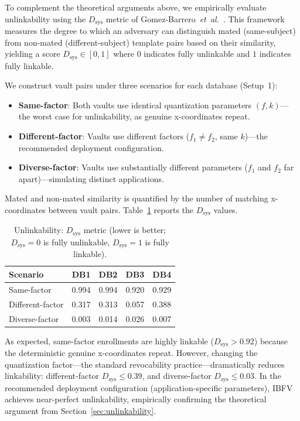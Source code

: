 \documentclass[3p,twocolumn]{elsarticle}
\newcommand{\IBFV}{\textsf{IBFV}}
\begin{document}
To complement the theoretical arguments above, we empirically evaluate unlinkability using the $D_{\text{sys}}$ metric of Gomez-Barrero~\textit{et~al.}~\cite{gomezbarrero2017}. This framework measures the degree to which an adversary can distinguish mated (same-subject) from non-mated (different-subject) template pairs based on their similarity, yielding a score $D_{\text{sys}} \in [0, 1]$ where $0$ indicates fully unlinkable and $1$ indicates fully linkable.

We construct vault pairs under three scenarios for each database (Setup~1):
\begin{itemize}
    \item \textbf{Same-factor}: Both vaults use identical quantization parameters $(f, k)$---the worst case for unlinkability, as genuine x-coordinates repeat.
    \item \textbf{Different-factor}: Vaults use different factors ($f_1 \neq f_2$, same $k$)---the recommended deployment configuration.
    \item \textbf{Diverse-factor}: Vaults use substantially different parameters ($f_1$ and $f_2$ far apart)---simulating distinct applications.
\end{itemize}

Mated and non-mated similarity is quantified by the number of matching x-coordinates between vault pairs. Table~\ref{tab:dsys} reports the $D_{\text{sys}}$ values.

\begin{table}[t]
\centering
\caption{Unlinkability: $D_{\text{sys}}$ metric (lower is better; $D_{\text{sys}} = 0$ is fully unlinkable, $D_{\text{sys}} = 1$ is fully linkable).}
\label{tab:dsys}
\begin{tabular}{@{}l c c c c@{}}
\toprule
\textbf{Scenario} & \textbf{DB1} & \textbf{DB2} & \textbf{DB3} & \textbf{DB4} \\
\midrule
Same-factor     & 0.994 & 0.994 & 0.920 & 0.929 \\
Different-factor & 0.317 & 0.313 & 0.057 & 0.388 \\
Diverse-factor   & 0.003 & 0.014 & 0.026 & 0.007 \\
\bottomrule
\end{tabular}
\end{table}

As expected, same-factor enrollments are highly linkable ($D_{\text{sys}} > 0.92$) because the deterministic genuine x-coordinates repeat. However, changing the quantization factor---the standard revocability practice---dramatically reduces linkability: different-factor $D_{\text{sys}} \leq 0.39$, and diverse-factor $D_{\text{sys}} \leq 0.03$. In the recommended deployment configuration (application-specific parameters), \IBFV{} achieves near-perfect unlinkability, empirically confirming the theoretical argument from Section~\ref{sec:unlinkability}.
\end{document}
